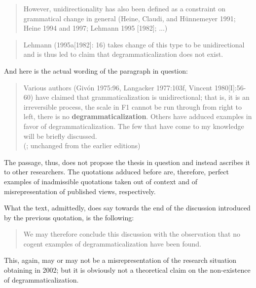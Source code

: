 \begin{quote}
However, unidirectionality has also been defined as a constraint on grammatical change in general (Heine, Claudi, and Hünnemeyer 1991; Heine 1994 and 1997; Lehmann 1995 [1982]; ...)\\
\citep[50]{Norde2009}
\end{quote}

\begin{quote}
Lehmann (1995a[1982]: 16) takes change of this type to be unidirectional and is thus led to claim that degrammaticalization does not exist.\\
\citep[163]{BoerjarsEtAl2011}
\end{quote}

And here is the actual wording of the paragraph in question:

\begin{quote}
Various authors (Givón 1975:96, Langacker 1977:103f, Vincent 1980[I]:56-60) have claimed that grammaticalization is unidirectional; that is, it is an irreversible process, the scale in F1 cannot be run through from right to left, there is no \textbf{degrammaticalization}. Others have adduced examples in favor of degrammaticalization. The few that have come to my knowledge will be briefly discussed.\\
(\citealt[14]{Lehmann2002}; unchanged from the earlier editions)
\end{quote}

The passage, thus, does not propose the thesis in question and instead ascribes it to other researchers. The quotations adduced before are, therefore, perfect examples of inadmissible quotations taken out of context and of misrepresentation of published views, respectively.

What the text, admittedly, does say towards the end of the discussion introduced by the previous quotation, is the following:

\begin{quote}
We may therefore conclude this discussion with the observation that no cogent examples of degrammaticalization have been found.\\
\citep[17]{Lehmann2002}
\end{quote}

This, again, may or may not be a misrepresentation of the research situation obtaining in 2002; but it is obviously not a theoretical claim on the non-existence of degrammaticalization.

